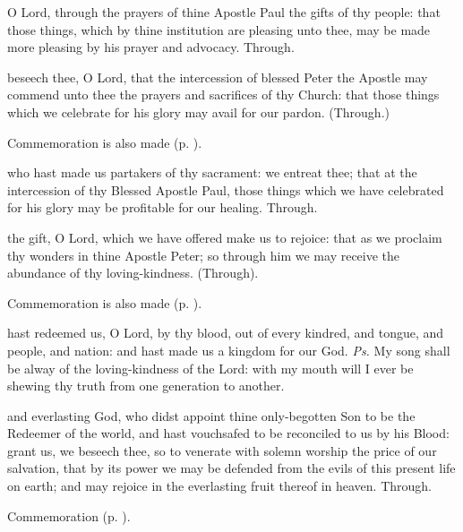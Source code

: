
\secret
{} O Lord, through the prayers of thine Apostle Paul the gifts of thy people: that those things, which by thine institution are pleasing unto thee, may be made more pleasing by his prayer and advocacy. Through.

 beseech thee, O Lord, that the intercession of blessed Peter the Apostle may commend unto thee the prayers and sacrifices of thy Church: that those things which we celebrate for his glory may avail for our pardon. (Through.)

\begin{rubric}
	Commemoration is also made  (p. \pageref{JohnBaptistSecret}).
\end{rubric}


\postcommunion
{} who hast made us partakers of thy sacrament: we entreat thee; that at the intercession of thy Blessed Apostle Paul, those things which we have celebrated for his glory may be profitable for our healing. Through.

 the gift, O Lord, which we have offered make us to rejoice: that as we proclaim thy wonders in thine Apostle Peter; so through him we may receive the abundance of thy loving-kindness. (Through).

\begin{rubric}
	Commemoration is also made  (p. \pageref{JohnBaptistPC}).
\end{rubric}



\introit
{} hast redeemed us, O Lord, by thy blood, out of every kindred, and tongue, and people, and nation: and hast made us a kingdom for our God. \textit{Ps.} My song shall be alway of the loving-kindness of the Lord: with my mouth will I ever be shewing thy truth from one generation to another.

\collect
{} and everlasting God, who didst appoint thine only-begotten Son to be the Redeemer of the world, and hast vouchsafed to be reconciled to us by his Blood: grant us, we beseech thee, so to venerate with solemn worship the price of our salvation, that by its power we may be defended from the evils of this present life on earth; and may rejoice in the everlasting fruit thereof in heaven. Through.
\begin{rubric}
    Commemoration  (p. \pageref{JohnBaptistCollect}).
\end{rubric}

